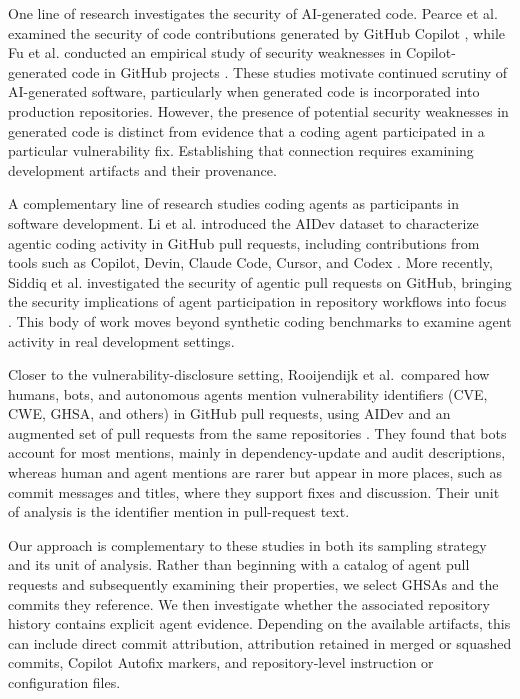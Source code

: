 \documentclass[smallextended,natbib]{svjour3}
\begin{document}
One line of research investigates the security of AI-generated code.
Pearce et al. examined the security of code contributions generated by GitHub
Copilot \citep{pearce2025asleep}, while Fu et al. conducted an empirical study
of security weaknesses in Copilot-generated code in GitHub projects
\citep{fu2025securityweaknessescopilotgeneratedcode}. These studies motivate
continued scrutiny of AI-generated software, particularly when generated
code is incorporated into production repositories. However, the presence of
potential security weaknesses in generated code is distinct from evidence
that a coding agent participated in a particular vulnerability fix. Establishing
that connection requires examining development artifacts and their provenance.

A complementary line of research studies coding agents as participants in
software development. Li et al. introduced the AIDev dataset to characterize
agentic coding activity in GitHub pull requests, including contributions from
tools such as Copilot, Devin, Claude Code, Cursor, and Codex
\citep{li2025aidev}. More recently, Siddiq et al. investigated the security
of agentic pull requests on GitHub, bringing the security implications of
agent participation in repository workflows into focus
\citep{siddiq2026securityageaiteammates}. This body of work moves beyond
synthetic coding benchmarks to examine agent activity in real development
settings.

Closer to the vulnerability-disclosure setting, Rooijendijk et al.\ compared
how humans, bots, and autonomous agents mention vulnerability identifiers
(CVE, CWE, GHSA, and others) in GitHub pull requests, using AIDev and an
augmented set of pull requests from the same repositories
\citep{rooijendijk2026said}.  They found that bots account for most
mentions, mainly in dependency-update and audit descriptions, whereas human
and agent mentions are rarer but appear in more places, such as commit
messages and titles, where they support fixes and discussion. Their unit of
analysis is the identifier mention in pull-request text.

Our approach is complementary to these studies in both its sampling strategy
and its unit of analysis. Rather than beginning with a catalog of agent
pull requests and subsequently examining their properties, we select GHSAs  and the commits they reference. We then investigate whether the
associated repository history contains explicit agent evidence. Depending on
the available artifacts, this can include direct commit attribution,
attribution retained in merged or squashed commits, Copilot Autofix markers,
and repository-level instruction or configuration files.
\end{document}
